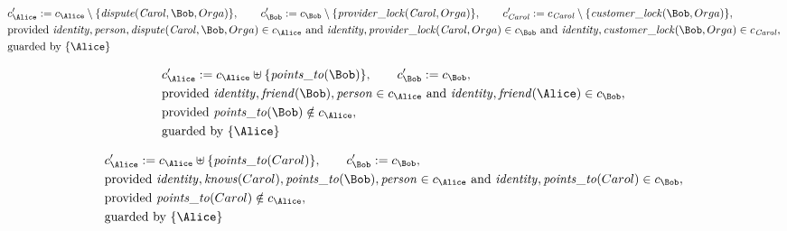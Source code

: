 \begin{align*}
&
c'_
{
\Alice
}
 := 
c_
{
\Alice
}
 \setminus 
\{
\mathit{\detokenize{
dispute
}}
(
\mathit{Carol}
,
\Bob
,
Orga
)
\}
, \qquad 
c'_
{
\Bob
}
 := 
c_
{
\Bob
}
 \setminus 
\{
\mathit{\detokenize{
provider_lock
}}
(
\mathit{Carol}
,
Orga
)
\}
, \qquad 
c'_
{
\mathit{Carol}
}
 := 
c_
{
\mathit{Carol}
}
 \setminus 
\{
\mathit{\detokenize{
customer_lock
}}
(
\Bob
,
Orga
)
\}
,\\
&
\text{provided } 
\mathit{\detokenize{
identity
}}
,
\mathit{\detokenize{
person
}}
,
\mathit{\detokenize{
dispute
}}
(
\mathit{Carol}
,
\Bob
,
Orga
)
 \in c_
{
\Alice
}
 \text{ and } 
\mathit{\detokenize{
identity
}}
,
\mathit{\detokenize{
provider_lock
}}
(
\mathit{Carol}
,
Orga
)
 \in c_
{
\Bob
}
 \text{ and } 
\mathit{\detokenize{
identity
}}
,
\mathit{\detokenize{
customer_lock
}}
(
\Bob
,
Orga
)
 \in c_
{
\mathit{Carol}
}
,\\
&
\text{guarded by } \{
\Alice
\}
\end{align*}

\begin{align*}
&
c'_
{
\Alice
}
 := 
c_
{
\Alice
}
 \uplus 
\{
\mathit{\detokenize{
points_to
}}
(
\Bob
)
\}
, \qquad 
c'_
{
\Bob
}
 := 
c_
{
\Bob
}
,\\
&
\text{provided } 
\mathit{\detokenize{
identity
}}
,
\mathit{\detokenize{
friend
}}
(
\Bob
)
,
\mathit{\detokenize{
person
}}
 \in c_
{
\Alice
}
 \text{ and } 
\mathit{\detokenize{
identity
}}
,
\mathit{\detokenize{
friend
}}
(
\Alice
)
 \in c_
{
\Bob
}
,\\
&
\text{provided } 
\mathit{\detokenize{
points_to
}}
(
\Bob
)
 \notin c_
{
\Alice
}
,\\
&
\text{guarded by } \{
\Alice
\}
\end{align*}

\begin{align*}
&
c'_
{
\Alice
}
 := 
c_
{
\Alice
}
 \uplus 
\{
\mathit{\detokenize{
points_to
}}
(
Carol
)
\}
, \qquad 
c'_
{
\Bob
}
 := 
c_
{
\Bob
}
,\\
&
\text{provided } 
\mathit{\detokenize{
identity
}}
,
\mathit{\detokenize{
knows
}}
(
Carol
)
,
\mathit{\detokenize{
points_to
}}
(
\Bob
)
,
\mathit{\detokenize{
person
}}
 \in c_
{
\Alice
}
 \text{ and } 
\mathit{\detokenize{
identity
}}
,
\mathit{\detokenize{
points_to
}}
(
Carol
)
 \in c_
{
\Bob
}
,\\
&
\text{provided } 
\mathit{\detokenize{
points_to
}}
(
Carol
)
 \notin c_
{
\Alice
}
,\\
&
\text{guarded by } \{
\Alice
\}
\end{align*}
